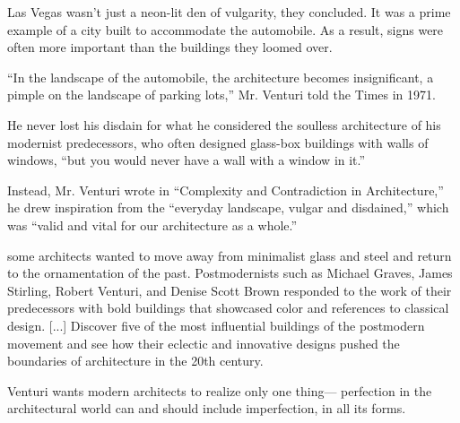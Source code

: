      Las Vegas wasn’t just a neon-lit den of vulgarity, they concluded.
     It was a prime example of a city built to accommodate the automobile.
     As a result, signs were often more important than the buildings they loomed over.\cite{Schudel2018}

    “In the landscape of the automobile, the architecture becomes insignificant, a pimple on the landscape of parking lots,” Mr. Venturi told the Times in 1971.\cite{Schudel2018}

    He never lost his disdain for what he considered the soulless architecture of his modernist predecessors, who often designed glass-box buildings with walls of windows, “but you would never have a wall with a window in it.”\cite{Schudel2018}

    Instead, Mr. Venturi wrote in “Complexity and Contradiction in Architecture,” he drew inspiration from the “everyday landscape, vulgar and disdained,” which was “valid and vital for our architecture as a whole.”\cite{Schudel2018}

    some architects wanted to move away from minimalist glass and steel and return to the ornamentation of the past. Postmodernists such as Michael Graves, James Stirling, Robert Venturi, and Denise Scott Brown responded to the work of their predecessors with bold buildings that showcased color and references to classical design. [...] Discover five of the most influential buildings of the postmodern movement and see how their eclectic and innovative designs pushed the boundaries of architecture in the 20th century\cite{Stamp2016}.

    Venturi wants modern architects to realize only one thing— perfection in the architectural world can and should include imperfection, in all its forms\cite{Lutolli2020}.




